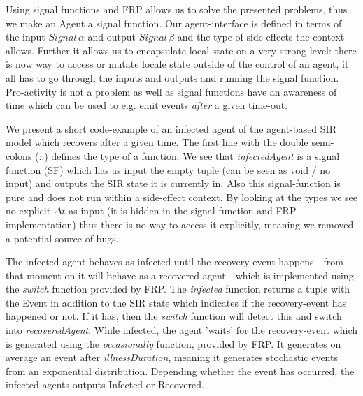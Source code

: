 
Using signal functions and FRP allows us to solve the presented problems, thus we make an Agent a signal function. Our agent-interface is defined in terms of the input $Signal \, \alpha$ and output $Signal \, \beta$ and the type of side-effects the context allows. Further it allows us to encapsulate local state on a very strong level: there is now way to access or mutate locale state outside of the control of an agent, it all has to go through the inputs and outputs and running the signal function. Pro-activity is not a problem as well as signal functions have an awareness of time which can be used to e.g. emit events \textit{after} a given time-out. 

We present a short code-example of an infected agent of the agent-based SIR model \cite{macal_agent-based_2010} which recovers after a given time. The first line with the double semi-colons (::) defines the type of a function. We see that \textit{infectedAgent} is a signal function (SF) which has as input the empty tuple (can be seen as void / no input) and outputs the SIR state it is currently in. Also this signal-function is pure and does not run within a side-effect context. By looking at the types we see no explicit $\Delta t$ as input (it is hidden in the signal function and FRP implementation) thus there is no way to access it explicitly, meaning we removed a potential source of bugs.

The infected agent behaves as infected until the recovery-event happens - from that moment on it will behave as a recovered agent - which is implemented using the \textit{switch} function provided by FRP. The \textit{infected} function returns a tuple with the Event in addition to the SIR state which indicates if the recovery-event has happened or not. If it has, then the \textit{switch} function will detect this and switch into \textit{recoveredAgent}. While infected, the agent 'waits' for the recovery-event which is generated using the \textit{occasionally} function, provided by FRP. It generates on average an event after \textit{illnessDuration}, meaning it generates stochastic events from an exponential distribution. Depending whether the event has occurred, the infected agents outputs Infected or Recovered.

